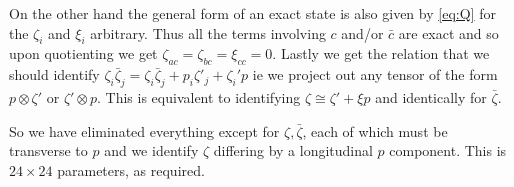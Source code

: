 \documentclass[11pt, class=article, crop=false]{standalone}
\begin{document}
\begin{enumerate}
	  On the other hand the general form of an exact state is also given by \eqref{eq:Q} for the $\zeta_i$ and $\xi_i$ arbitrary. Thus all the terms involving $c$ and/or $\bar c$ are exact and so upon quotienting we get $\zeta_{ac} = \zeta_{bc} = \xi_{cc} = 0$. Lastly we get the relation that we should identify $\zeta_i \bar \zeta_j = \zeta_i \bar \zeta_j + p_i \zeta'_j + \zeta_i' p $
	 ie we project out any tensor of the form $p \otimes \zeta'$ or $\zeta' \otimes p$. This is equivalent to identifying $\zeta \cong \zeta' + \xi p$ and identically for $\bar \zeta$. 
	 
	 So we have eliminated everything except for $\zeta, \bar \zeta$, each of which must be transverse to $p$ and we identify $\zeta$ differing by a longitudinal $p$ component. This is $24 \times 24$ parameters, as required.  
	  

	  

\end{enumerate}
\end{document}
